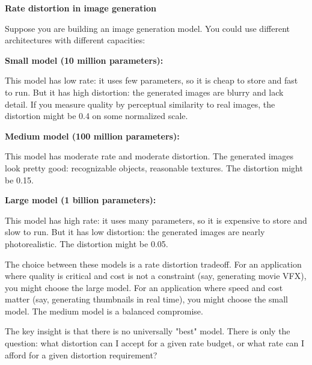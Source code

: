 \begin{examplebox}
\textbf{Rate distortion in image generation}

\vspace{0.5em}

Suppose you are building an image generation model. You could use different architectures with different capacities:

\vspace{0.5em}

\textbf{Small model (10 million parameters):}

This model has low rate: it uses few parameters, so it is cheap to store and fast to run. But it has high distortion: the generated images are blurry and lack detail. If you measure quality by perceptual similarity to real images, the distortion might be 0.4 on some normalized scale.

\vspace{0.5em}

\textbf{Medium model (100 million parameters):}

This model has moderate rate and moderate distortion. The generated images look pretty good: recognizable objects, reasonable textures. The distortion might be 0.15.

\vspace{0.5em}

\textbf{Large model (1 billion parameters):}

This model has high rate: it uses many parameters, so it is expensive to store and slow to run. But it has low distortion: the generated images are nearly photorealistic. The distortion might be 0.05.

\vspace{0.5em}

The choice between these models is a rate distortion tradeoff. For an application where quality is critical and cost is not a constraint (say, generating movie VFX), you might choose the large model. For an application where speed and cost matter (say, generating thumbnails in real time), you might choose the small model. The medium model is a balanced compromise.

\vspace{0.5em}

The key insight is that there is no universally "best" model. There is only the question: what distortion can I accept for a given rate budget, or what rate can I afford for a given distortion requirement?
\end{examplebox}

